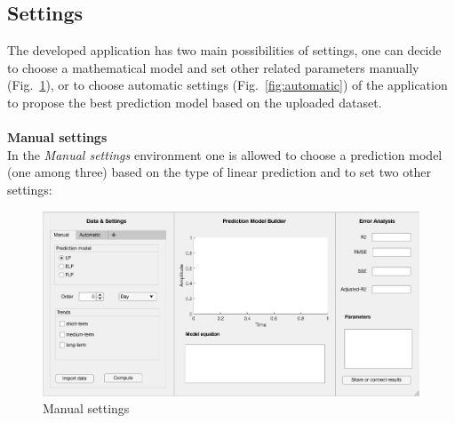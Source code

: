         
        \subsection{Settings}\label{subsec:setting}
        The developed application has two main possibilities of settings, one can decide to choose a mathematical model and set other related parameters manually (Fig.~\ref{fig:manual}), or to choose automatic settings (Fig.~\ref{fig:automatic}) of the application to propose the best prediction model
        based on the uploaded dataset.\\
        \\
        \textbf{Manual settings}\\
     In the \emph{Manual settings} environment one is allowed to choose a prediction model (one among three) based on the type of linear prediction and to set two other settings:
       \begin{figure}[h!]
        \centering
	   \includegraphics[width=\textwidth]{figures/manual.png}
            \caption{Manual settings}
            \label{fig:manual}
    \end{figure}

